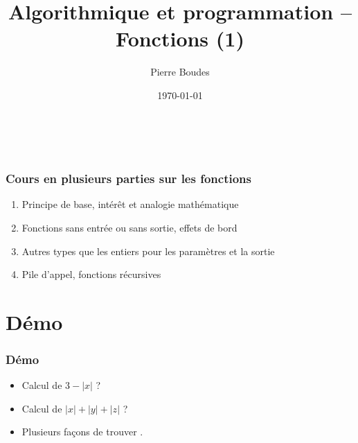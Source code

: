 \documentclass[xcolor=pdftex,svgnames,table]{beamer}
\title{Algorithmique et programmation -- Fonctions (1)}
\author{Pierre Boudes}
\date{\today}
\begin{document}
\begin{frame}
	\titlepage
	\vfill
	\begin{center}
		\\[2.5ex]
		{\tiny\CcNote{\CcLongnameByNcSa}}
		\vspace*{-2.5ex}
	\end{center}
\end{frame}



\begin{frame}
  \frametitle{Cours en plusieurs parties sur les fonctions \nowrite}

\begin{enumerate}
    \item Principe de base, intérêt et analogie mathématique
    \item Fonctions sans entrée ou sans sortie, effets de bord
    \item Autres types que les entiers pour les paramètres et la sortie
    \item Pile d'appel, fonctions récursives
  \end{enumerate}
\end{frame}

\section[Plan]{}

\section[Démo]{Démo}
\begin{frame}
  \frametitle{Démo\nowrite}

  \begin{itemize}
    \item Calcul de $3 - |x|$ ?\pause
     \item Calcul de $|x| + |y| + |z|$ ?\pause
     \item Plusieurs façons de trouver .
  \end{itemize}
\end{frame}
\end{document}

